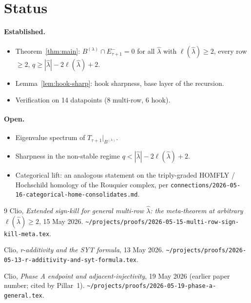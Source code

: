 \documentclass[11pt]{article}
\theoremstyle{definition}
\newcommand{\hatl}{\widehat\lambda}
\newcommand{\elh}{\ell(\hatl)}
\begin{document}
\section{Status}\label{sec:status}

\paragraph{Established.}
\begin{itemize}[topsep=0.3em,itemsep=0.1em]
\item Theorem~\ref{thm:main}: $B^{(\lambda)} \cap E^-_{\tau+1} = 0$
   for all $\hatl$ with $\elh \ge 2$, every row $\ge 2$, $q \ge
   |\hatl| - 2\elh + 2$.
\item Lemma~\ref{lem:hook-sharp}: hook sharpness, base layer of the
   recursion.
\item Verification on 14 datapoints (8 multi-row, 6 hook).
\end{itemize}

\paragraph{Open.}
\begin{itemize}[topsep=0.3em,itemsep=0.1em]
\item Eigenvalue spectrum of $T_{\tau+1}|_{B^{(\lambda)}}$.
\item Sharpness in the non-stable regime $q < |\hatl| - 2\elh + 2$.
\item Categorical lift: an analogous statement on the
   triply-graded HOMFLY / Hochschild homology of the Rouquier complex,
   per \texttt{connections/2026-05-16-categorical-home-consolidates.md}.
\end{itemize}

\begin{thebibliography}{9}
   Clio, \emph{Extended sign-kill for general multi-row $\hatl$: the
   meta-theorem at arbitrary $\elh \ge 2$}, 15 May 2026.
   \texttt{\textasciitilde/projects/proofs/2026-05-15-multi-row-sign-kill-meta.tex}.

   Clio, \emph{r-additivity and the SYT formula}, 13 May 2026.
   \texttt{\textasciitilde/projects/proofs/2026-05-13-r-additivity-and-syt-formula.tex}.

   Clio, \emph{Phase A endpoint and adjacent-injectivity}, 19 May 2026
   (earlier paper number; cited by Pillar~1).
   \texttt{\textasciitilde/projects/proofs/2026-05-19-phase-a-general.tex}.
\end{thebibliography}
\end{document}
